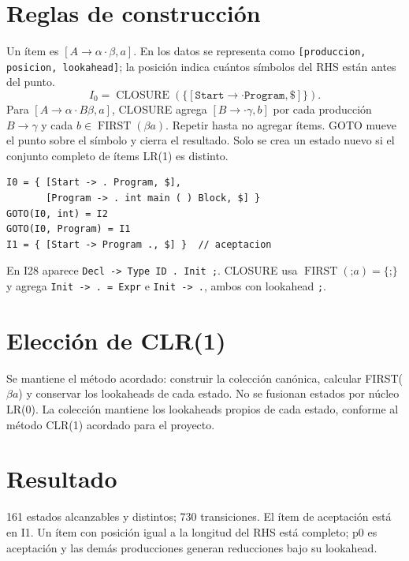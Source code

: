 

\section*{Reglas de construcción}
Un ítem es $[A\to\alpha\cdot\beta,a]$. En los datos se representa como \texttt{[produccion, posicion, lookahead]}; la posición indica cuántos símbolos del RHS están antes del punto.
\[
I_0=\operatorname{CLOSURE}(\{[\texttt{Start}\to\cdot\texttt{Program},\$]\}).
\]
Para $[A\to\alpha\cdot B\beta,a]$, CLOSURE agrega $[B\to\cdot\gamma,b]$ por cada producción $B\to\gamma$ y cada $b\in\operatorname{FIRST}(\beta a)$. Repetir hasta no agregar ítems. GOTO mueve el punto sobre el símbolo y cierra el resultado. Solo se crea un estado nuevo si el conjunto completo de ítems LR(1) es distinto.

\begin{lstlisting}
I0 = { [Start -> . Program, $],
       [Program -> . int main ( ) Block, $] }
GOTO(I0, int) = I2
GOTO(I0, Program) = I1
I1 = { [Start -> Program ., $] }  // aceptacion
\end{lstlisting}
En I28 aparece \texttt{Decl -> Type ID . Init ;}. CLOSURE usa $\operatorname{FIRST}(\texttt{;}a)=\{\texttt{;}\}$ y agrega \texttt{Init -> . = Expr} e \texttt{Init -> .}, ambos con lookahead \texttt{;}.
\section*{Elección de CLR(1)}
Se mantiene el método acordado: construir la colección canónica, calcular FIRST($\beta a$) y conservar los lookaheads de cada estado. No se fusionan estados por núcleo LR(0). La colección mantiene los lookaheads propios de cada estado, conforme al método CLR(1) acordado para el proyecto.
\section*{Resultado}
161 estados alcanzables y distintos; 730 transiciones. El ítem de aceptación está en I1. Un ítem con posición igual a la longitud del RHS está completo; p0 es aceptación y las demás producciones generan reducciones bajo su lookahead.


\clearpage
